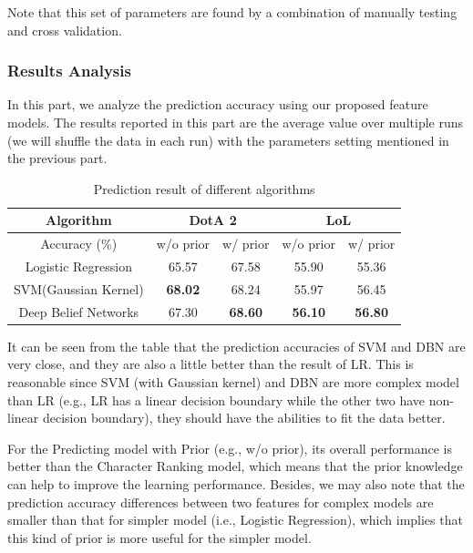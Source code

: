 \documentclass{article} %
\begin{document}
Note that this set of parameters are found by a combination of manually testing and cross validation.


\subsubsection{Results Analysis}

In this part, we analyze the prediction accuracy using our proposed feature models. The results reported in this part are the average value over multiple runs (we will shuffle the data in each run) with the parameters setting mentioned in the previous part.


\begin{table}[h]
\center
{}
\caption{Prediction result of different algorithms}
\begin{tabular}{|c |c |c |c |c |}
\hline
Algorithm & \multicolumn{2}{c|}{DotA 2}    & \multicolumn{2}{c|}{LoL}   \\
\hline
Accuracy (\%) & w/o prior   & w/ prior  & w/o prior  & w/ prior  \\ \hline
Logistic Regression    & 65.57         & 67.58     & 55.90         & 55.36
\\ \hline
SVM(Gaussian Kernel) & \textbf{68.02} & 68.24 & 55.97 & 56.45
\\ \hline
Deep Belief Networks  & 67.30  & \textbf{68.60}   & \textbf{56.10} & \textbf{56.80}     \\ \hline
\end{tabular}\label{tab:1}
\end{table}

It can be seen from the table that the prediction accuracies of SVM and DBN are very close, and they are also a little better than the result of LR. This is reasonable since SVM (with Gaussian kernel) and DBN are more complex model than LR (e.g., LR has a linear decision boundary while the other two have non-linear decision boundary), they should have the abilities to fit the data better.

For the Predicting model with Prior (e.g., w/o prior), its overall performance is better than the Character Ranking model, which means that the prior knowledge can help to improve the learning performance. Besides, we may also note that the prediction accuracy differences between two features for complex models are smaller than that for simpler model (i.e., Logistic Regression), which implies that this kind of prior is more useful for the simpler model.
\end{document}
